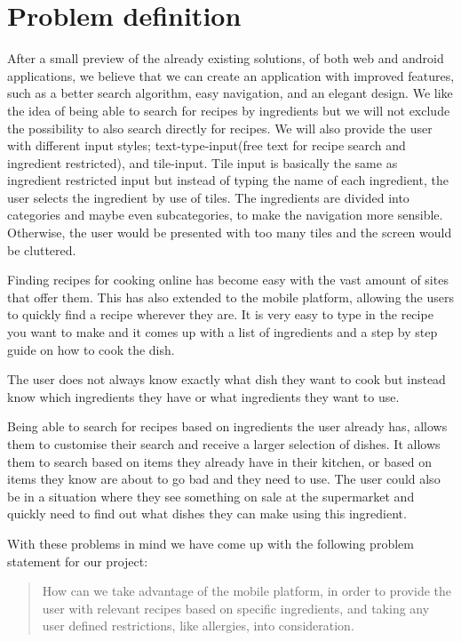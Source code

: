\section{Problem definition}\label{sec:probdef}

After a small preview of the already existing solutions, of both web and android applications, we believe that we can create an application with improved features, such as a better search algorithm, easy navigation, and an elegant design. We like the idea of being able to search for recipes by ingredients but we will not exclude the possibility to also search directly for recipes. We will also provide the user with different input styles; text-type-input(free text for recipe search and ingredient restricted), and tile-input. Tile input is basically the same as ingredient restricted input but instead of typing the name of each ingredient, the user selects the ingredient by use of tiles. The ingredients are divided into categories and maybe even subcategories, to make the navigation more sensible. Otherwise, the user would be presented with too many tiles and the screen would be cluttered.

Finding recipes for cooking online has become easy with the vast amount of sites that offer them. This has also extended to the mobile platform, allowing the users to quickly find a recipe wherever they are. It is very easy to type in the recipe you want to make and it comes up with a list of ingredients and a step by step guide on how to cook the dish.

The user does not always know exactly what dish they want to cook but instead know which ingredients they have or what ingredients they want to use.

Being able to search for recipes based on ingredients the user already has, allows them to customise their search and receive a larger selection of dishes. It allows them to search based on items they already have in their kitchen, or based on items they know are about to go bad and they need to use. The user could also be in a situation where they see something on sale at the supermarket and quickly need to find out what dishes they can make using this ingredient.

With these problems in mind we have come up with the following problem statement for our project:

\begin{quote}
How can we take advantage of the mobile platform, in order to provide the user with relevant recipes based on specific ingredients, and taking any user defined restrictions, like allergies, into consideration.
\end{quote}